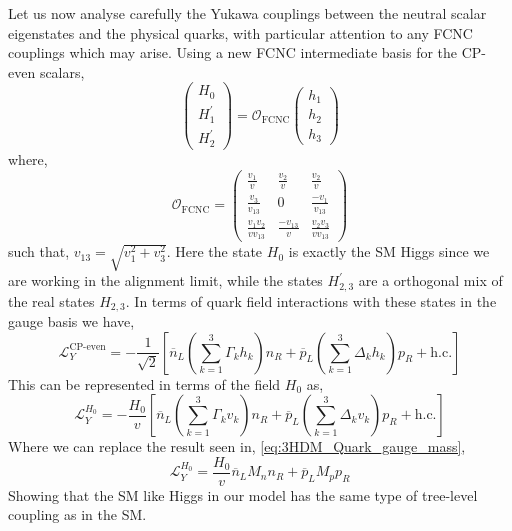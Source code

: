 Let us now analyse carefully the Yukawa couplings between the neutral scalar eigenstates and the physical quarks, with particular attention to any FCNC couplings which may arise.
%
Using a new FCNC intermediate basis for the CP-even scalars,
% 
\begin{equation}
\left( 
\begin{array}{c}
H_0 \\
H_1^\prime \\ 
H_2^\prime 
\end{array} 
\right) = \mathcal{O}_{\text{FCNC}} \left( 
\begin{array}{c}
h_1 \\
h_2 \\
h_3 
\end{array} 
\right)
\end{equation} 
where, 
\begin{equation}
\mathcal{O}_{\text{FCNC}} = 
\begin{pmatrix}
\frac{v_1}{v} & \frac{v_2}{v} & \frac{v_2}{v} \\ 
\frac{v_3}{v_{13}} & 0 & \frac{-v_1}{v_{13}}  \\ 
\frac{v_1 v_2}{v v_{13}} & \frac{-v_{13}}{v} &  \frac{v_{2} v_3}{v v_{13}}
\end{pmatrix}  
\end{equation}
%
such that, $v_{13} = \sqrt{v_1^2 + v_3^2 }$. Here the state $H_0$ is exactly the SM Higgs since we are working in the alignment limit, while the states $H^\prime_{2,3}$ are a orthogonal mix of the real states $H_{2,3}$. 
%
In terms of quark field interactions with these states in the gauge basis we have, 
\begin{equation}
\mathcal{L}_Y^{\text{CP-even}} = 
- \frac{1}{\sqrt{2}} \left[ \overline{n}_L \left( \sum_{k=1}^3 \Gamma_k h_k \right) n_R + \overline{p}_L \left( \sum_{k=1}^3 \Delta_k h_k \right) p_R  + \text{h.c.}  \right] 
\end{equation}
This can be represented in terms of the field $H_0$ as, 
\begin{equation}
\mathcal{L}_Y^{H_0} =
- \frac{H_0}{v} \left[ \overline{n}_L \left( \sum_{k=1}^3 \Gamma_k v_k \right) n_R + \overline{p}_L \left( \sum_{k=1}^3 \Delta_k v_k \right) p_R + \text{h.c.} \right] 
\end{equation}
Where we can replace the result seen in, \ref{eq:3HDM_Quark_gauge_mass}, 
%
\begin{equation}
\mathcal{L}_Y^{H_0} = \frac{H_0}{v} \overline{n}_L M_n n_R +  \overline{p}_L M_p p_R  
\end{equation} 
Showing that the SM like Higgs in our model has the same type of tree-level coupling as in the SM. 

